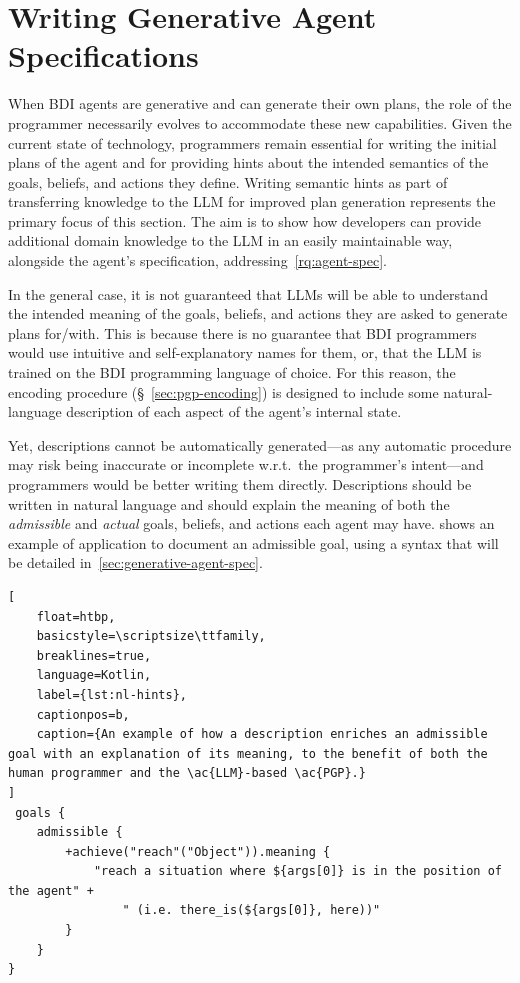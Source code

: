 \documentclass[12pt,a4paper,openright,twoside]{book}
\begin{document}
\section{Writing Generative Agent Specifications}\label{sec:writing-generative-agent-specs}

When \ac{BDI} agents are generative and can generate their own plans, the role of the programmer necessarily evolves to accommodate these new capabilities. 
%
Given the current state of technology, programmers remain essential for writing the initial plans of the agent and for providing hints about the intended semantics of the goals, beliefs, and actions they define.
%
Writing semantic hints as part of transferring knowledge to the \ac{LLM} for improved plan generation represents the primary focus of this section.
%
The aim is to show how developers can provide additional domain knowledge to the \ac{LLM} in an easily maintainable way, alongside the agent's specification, addressing~\cref{rq:agent-spec}.

In the general case, it is not guaranteed that \acp{LLM} will be able to understand the intended meaning of the goals, beliefs, and actions they are asked to generate plans for/with.
%
This is because there is no guarantee that \ac{BDI} programmers would use intuitive and self-explanatory names for them, or, that the \ac{LLM} is trained on the \ac{BDI} programming language of choice.
%
For this reason, the encoding procedure (\S~\ref{sec:pgp-encoding}) is designed to include some natural-language description of each aspect of the agent's internal state.

Yet, descriptions cannot be automatically generated---as any automatic procedure may risk being inaccurate or incomplete w.r.t.\ the programmer's intent---and programmers would be better writing them directly.
%
Descriptions should be written in natural language and should explain the meaning of both the \emph{admissible} and \emph{actual} goals, beliefs, and actions each agent may have.
%
 shows an example of application to document an admissible goal, using a syntax that will be detailed in~\cref{sec:generative-agent-spec}.

\begin{lstlisting}[
    float=htbp,
    basicstyle=\scriptsize\ttfamily,
    breaklines=true,
    language=Kotlin,
    label={lst:nl-hints},
    captionpos=b,
    caption={An example of how a description enriches an admissible goal with an explanation of its meaning, to the benefit of both the human programmer and the \ac{LLM}-based \ac{PGP}.}
]
 goals {
    admissible {
        +achieve("reach"("Object")).meaning {
            "reach a situation where ${args[0]} is in the position of the agent" +
                " (i.e. there_is(${args[0]}, here))"
        }
    }
}
\end{lstlisting}
\end{document}
